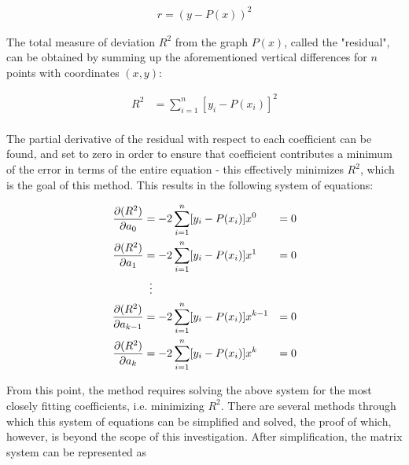 \documentclass[12pt, a4paper]{article}
\begin{document}
\begin{align*}
    r=(y-P(x))^2
\end{align*}

The total measure of deviation $R^2$ from the graph $P(x)$, called the
"residual", can be obtained by summing up the aforementioned vertical
differences for $n$ points with coordinates $(x, y)$:

\begin{align*}
    R^2 & = \sum^n_{i=1}[y_i-P(x_i)]^2 \\
\end{align*}

The partial derivative of the residual with respect to each coefficient can be
found, and set to zero in order to ensure that coefficient contributes a minimum
of the error in terms of the entire equation - this effectively minimizes $R^2$,
which is the goal of this method. This results in the following system of
equations:

\begin{align*}
    \frac{\partial (R^2)}{\partial a_0}     & = -2 \sum^n_{i=1}[y_i-P(x_i)] x^0     & = 0 \\
    \frac{\partial (R^2)}{\partial a_1}     & = -2 \sum^n_{i=1}[y_i-P(x_i)] x^1     & = 0 \\
                                            & \vdotswithin{=}                             \\
    \frac{\partial (R^2)}{\partial a_{k-1}} & = -2 \sum^n_{i=1}[y_i-P(x_i)] x^{k-1} & = 0 \\
    \frac{\partial (R^2)}{\partial a_k}     & = -2 \sum^n_{i=1}[y_i-P(x_i)] x^k     & = 0
\end{align*}

From this point, the method requires solving the above system for the most
closely fitting coefficients, i.e. minimizing $R^2$. There are several methods
through which this system of equations can be simplified and solved, the proof
of which, however, is beyond the scope of this investigation. After
simplification, the matrix system can be represented as
\end{document}
